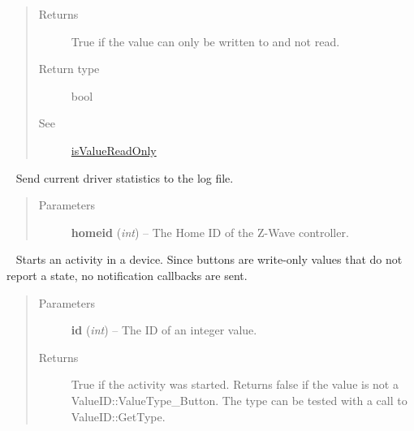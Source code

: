 \documentclass[letterpaper,10pt,english]{sphinxmanual}
\begin{document}
\begin{fulllineitems}
\begin{fulllineitems}
\begin{quote}
\begin{description}
\item[{Returns}] \leavevmode
True if the value can only be written to and not read.

\item[{Return type}] \leavevmode
bool

\item[{See}] \leavevmode
{\hyperref[libopenzwave:isvaluereadonly]{isValueReadOnly}}

\end{description}\end{quote}

\end{fulllineitems}


\begin{fulllineitems}
\label{libopenzwave:libopenzwave.PyManager.logDriverStatistics}~\label{libopenzwave:logdriverstatistics}
Send current driver statistics to the log file.
\begin{quote}\begin{description}
\item[{Parameters}] \leavevmode
\textbf{homeid} (\emph{int}) -- The Home ID of the Z-Wave controller.

\end{description}\end{quote}

\end{fulllineitems}


\begin{fulllineitems}
\label{libopenzwave:libopenzwave.PyManager.pressButton}~\label{libopenzwave:pressbutton}
Starts an activity in a device.
Since buttons are write-only values that do not report a state,
no notification callbacks are sent.
\begin{quote}\begin{description}
\item[{Parameters}] \leavevmode
\textbf{id} (\emph{int}) -- The ID of an integer value.

\item[{Returns}] \leavevmode
True if the activity was started. Returns false if the value is not a ValueID::ValueType\_Button. The type can be tested with a call to ValueID::GetType.


\end{description}
\end{quote}
\end{fulllineitems}
\end{fulllineitems}
\end{document}
